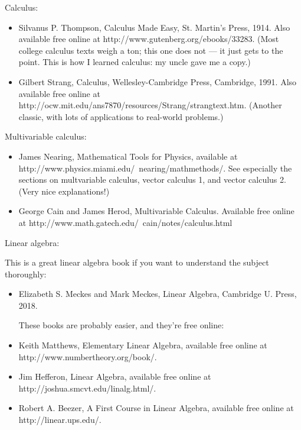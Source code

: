 \documentclass[10pt,a4paper]{book}
\theoremstyle{definition}
\begin{document}
Calculus:

\begin{itemize}
\item Silvanus P. Thompson, Calculus Made Easy, St. Martin's Press, 1914. Also available free online at http://www.gutenberg.org/ebooks/33283. (Most college calculus texts weigh a ton; this one does not — it just gets to the point. This is how I learned calculus: my uncle gave me a copy.)

\item Gilbert Strang, Calculus, Wellesley-Cambridge Press, Cambridge, 1991. Also available free online at http://ocw.mit.edu/ans7870/resources/Strang/strangtext.htm. (Another classic, with lots of applications to real-world problems.)
\end{itemize}

Multivariable calculus:

\begin{itemize}
\item James Nearing, Mathematical Tools for Physics, available at http://www.physics.miami.edu/~nearing/mathmethods/. See especially the sections on multvariable calculus, vector calculus 1, and vector calculus 2. (Very nice explanations!)

\item George Cain and James Herod, Multivariable Calculus. Available free online at http://www.math.gatech.edu/~cain/notes/calculus.html
\end{itemize}

Linear algebra:

This is a great linear algebra book if you want to understand the subject thoroughly:

\begin{itemize}
\item Elizabeth S. Meckes and Mark Meckes, Linear Algebra, Cambridge U. Press, 2018.

These books are probably easier, and they're free online:

\item Keith Matthews, Elementary Linear Algebra, available free online at http://www.numbertheory.org/book/.

\item Jim Hefferon, Linear Algebra, available free online at http://joshua.smcvt.edu/linalg.html/.

\item Robert A. Beezer, A First Course in Linear Algebra, available free online at http://linear.ups.edu/.
\end{itemize}
\end{document}
